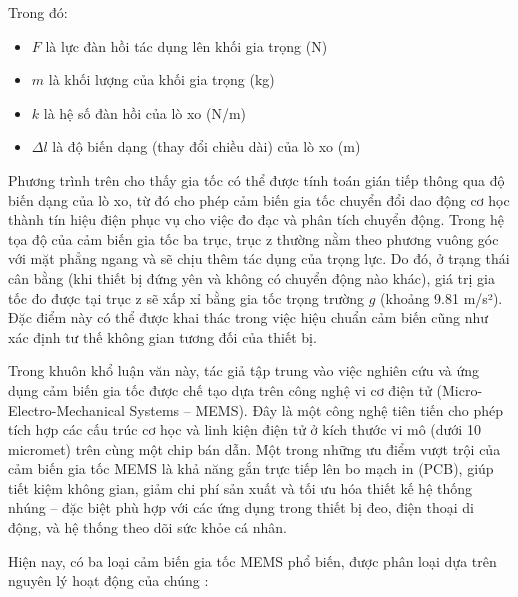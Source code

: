 Trong đó: \begin{itemize} \item $F$ là lực đàn hồi tác dụng lên khối gia trọng (N) \item $m$ là khối lượng của khối gia trọng (kg) \item $k$ là hệ số đàn hồi của lò xo (N/m) \item $\Delta l$ là độ biến dạng (thay đổi chiều dài) của lò xo (m) \end{itemize}

Phương trình trên cho thấy gia tốc có thể được tính toán gián tiếp thông qua độ biến dạng của lò xo, từ đó cho phép cảm biến gia tốc chuyển đổi dao động cơ học thành tín hiệu điện phục vụ cho việc đo đạc và phân tích chuyển động. Trong hệ tọa độ của cảm biến gia tốc ba trục, trục z thường nằm theo phương vuông góc với mặt phẳng ngang và sẽ chịu thêm tác dụng của trọng lực. Do đó, ở trạng thái cân bằng (khi thiết bị đứng yên và không có chuyển động nào khác), giá trị gia tốc đo được tại trục z sẽ xấp xỉ bằng gia tốc trọng trường $g$ (khoảng 9.81 m/s²). Đặc điểm này có thể được khai thác trong việc hiệu chuẩn cảm biến cũng như xác định tư thế không gian tương đối của thiết bị.

Trong khuôn khổ luận văn này, tác giả tập trung vào việc nghiên cứu và ứng dụng cảm biến gia tốc được chế tạo dựa trên công nghệ vi cơ điện tử (Micro-Electro-Mechanical Systems – MEMS). Đây là một công nghệ tiên tiến cho phép tích hợp các cấu trúc cơ học và linh kiện điện tử ở kích thước vi mô (dưới 10 micromet) trên cùng một chip bán dẫn. Một trong những ưu điểm vượt trội của cảm biến gia tốc MEMS là khả năng gắn trực tiếp lên bo mạch in (PCB), giúp tiết kiệm không gian, giảm chi phí sản xuất và tối ưu hóa thiết kế hệ thống nhúng – đặc biệt phù hợp với các ứng dụng trong thiết bị đeo, điện thoại di động, và hệ thống theo dõi sức khỏe cá nhân.



Hiện nay, có ba loại cảm biến gia tốc MEMS phổ biến, được phân loại dựa trên nguyên lý hoạt động của chúng \cite{Acce}\cite{cambien}:

